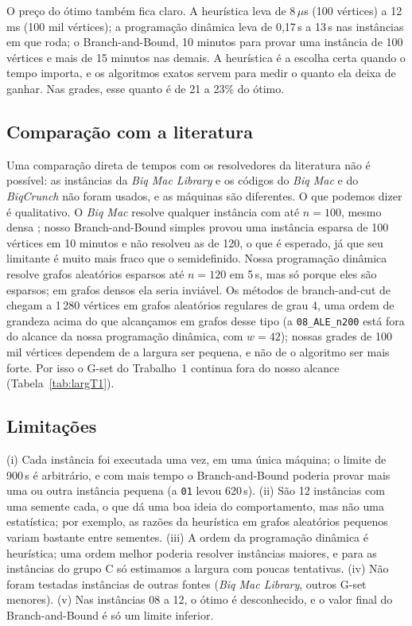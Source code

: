 O preço do ótimo também fica claro. A heurística leva de 8\,$\mu$s (100 vértices) a 12\,ms (100 mil vértices); a programação dinâmica leva de 0,17\,s a 13\,s nas instâncias em que roda; o Branch-and-Bound, 10 minutos para provar uma instância de 100 vértices e mais de 15 minutos nas demais. A heurística é a escolha certa quando o tempo importa, e os algoritmos exatos servem para medir o quanto ela deixa de ganhar. Nas grades, esse quanto é de 21 a 23\% do ótimo.

\subsection{Comparação com a literatura}

Uma comparação direta de tempos com os resolvedores da literatura não é possível: as instâncias da \emph{Biq Mac Library} e os códigos do \emph{Biq Mac} e do \emph{BiqCrunch} não foram usados, e as máquinas são diferentes. O que podemos dizer é qualitativo. O \emph{Biq Mac} resolve qualquer instância com até $n=100$, mesmo densa \cite{Rendl et al. 2010}; nosso Branch-and-Bound simples provou uma instância esparsa de 100 vértices em 10 minutos e não resolveu as de 120, o que é esperado, já que seu limitante é muito mais fraco que o semidefinido. Nossa programação dinâmica resolve grafos aleatórios esparsos até $n=120$ em 5\,s, mas só porque eles são esparsos; em grafos densos ela seria inviável. Os métodos de branch-and-cut de \citet{Liers et al. 2003} chegam a 1\,280 vértices em grafos aleatórios regulares de grau 4, uma ordem de grandeza acima do que alcançamos em grafos desse tipo (a \texttt{08\_ALE\_n200} está fora do alcance da nossa programação dinâmica, com $w=42$); nossas grades de 100 mil vértices dependem de a largura ser pequena, e não de o algoritmo ser mais forte. Por isso o G-set do Trabalho~1 continua fora do nosso alcance (Tabela~\ref{tab:largT1}).

\subsection{Limitações}

(i) Cada instância foi executada uma vez, em uma única máquina; o limite de 900\,s é arbitrário, e com mais tempo o Branch-and-Bound poderia provar mais uma ou outra instância pequena (a \texttt{01} levou 620\,s). (ii) São 12 instâncias com uma semente cada, o que dá uma boa ideia do comportamento, mas não uma estatística; por exemplo, as razões da heurística em grafos aleatórios pequenos variam bastante entre sementes. (iii) A ordem da programação dinâmica é heurística; uma ordem melhor poderia resolver instâncias maiores, e para as instâncias do grupo C só estimamos a largura com poucas tentativas. (iv) Não foram testadas instâncias de outras fontes (\emph{Biq Mac Library}, outros G-set menores). (v) Nas instâncias 08 a 12, o ótimo é desconhecido, e o valor final do Branch-and-Bound é só um limite inferior.

